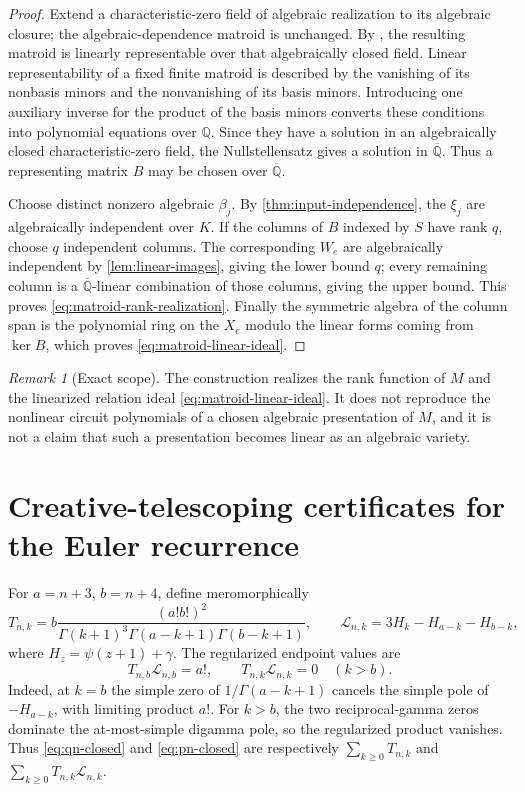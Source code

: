 \documentclass[11pt]{article}
\theoremstyle{keio}
\theoremstyle{definition}
\theoremstyle{remark}
\newtheorem{remark}[theorem]{Remark}
\newcommand{\Q}{\mathbb Q}
\newcommand{\Qbar}{\overline{\mathbb Q}}
\begin{document}
\begin{proof}
Extend a characteristic-zero field of algebraic realization to its
algebraic closure; the algebraic-dependence matroid is unchanged.  By
\cite[Thm.~1.10]{RosenSidmanTheran2025}, the resulting matroid is linearly
representable over that algebraically closed field.  Linear
representability of a fixed finite
matroid is described by the vanishing of its nonbasis minors and the
nonvanishing of its basis minors.  Introducing one auxiliary inverse for
the product of the basis minors converts these conditions into polynomial
equations over \(\Q\).  Since they have a solution in an algebraically
closed characteristic-zero field, the Nullstellensatz gives a solution in
\(\Qbar\).  Thus a representing matrix \(B\) may be chosen over \(\Qbar\).

Choose distinct nonzero algebraic \(\beta_j\).  By
\cref{thm:input-independence}, the \(\xi_j\) are algebraically independent
over \(K\).  If the columns of \(B\) indexed by \(S\) have rank \(q\),
choose \(q\) independent columns.  The corresponding \(W_e\) are
algebraically independent by \cref{lem:linear-images}, giving the lower
bound \(q\); every remaining column is a \(\Qbar\)-linear combination of
those columns, giving the upper bound.  This proves
\eqref{eq:matroid-rank-realization}.  Finally the symmetric algebra of the
column span is the polynomial ring on the \(X_e\) modulo the linear forms
coming from \(\ker B\), which proves \eqref{eq:matroid-linear-ideal}.
\end{proof}

\begin{remark}[Exact scope]
The construction realizes the rank function of \(M\) and the linearized
relation ideal \eqref{eq:matroid-linear-ideal}.  It does not reproduce the
nonlinear circuit polynomials of a chosen algebraic presentation of
\(M\), and it is not a claim that such a presentation becomes linear as an
algebraic variety.
\end{remark}

\section{Creative-telescoping certificates for the Euler recurrence}
\label{app:telescopers}

For \(a=n+3\), \(b=n+4\), define meromorphically
\[
 T_{n,k}=b\frac{(a!b!)^2}
 {\Gamma(k+1)^3\Gamma(a-k+1)\Gamma(b-k+1)},
 \qquad
 \mathcal L_{n,k}=3H_k-H_{a-k}-H_{b-k},
\]
where \(H_z=\psi(z+1)+\gamma\).  The regularized endpoint values are
\[
 T_{n,b}\mathcal L_{n,b}=a!,
 \qquad
 T_{n,k}\mathcal L_{n,k}=0\quad(k>b).
\]
Indeed, at \(k=b\) the simple zero of
\(1/\Gamma(a-k+1)\) cancels the simple pole of
\(-H_{a-k}\), with limiting product \(a!\).  For \(k>b\), the two
reciprocal-gamma zeros dominate the at-most-simple digamma pole, so the
regularized product vanishes.
Thus \eqref{eq:qn-closed} and \eqref{eq:pn-closed} are respectively
\(\sum_{k\ge0}T_{n,k}\) and
\(\sum_{k\ge0}T_{n,k}\mathcal L_{n,k}\).
\end{document}
